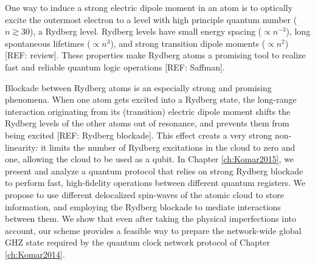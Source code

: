 One way to induce a strong electric dipole moment in an atom is to optically
excite the outermost electron to a level with high principle quantum number ($n
\gtrsim 30$), a Rydberg level. Rydberg levels have small energy spacing
($\propto n^{-3}$), long spontaneous lifetimes ($\propto n^3$), and strong
transition dipole moments ($\propto n^2$) [REF: review]. These properties make
Rydberg atoms a promising tool to realize fast and reliable quantum
logic operations [REF: Saffman]. 

Blockade between Rydberg atoms is an especially strong and promising phenomena.
When one atom gets excited into a Rydberg state, the long-range interaction
originating from its (transition) electric dipole moment shifts the Rydberg
levels of the other atoms out of resonance, and prevents them from being excited [REF: Rydberg
blockade]. This effect creats a very strong non-linearity: it limits the number
of Rydberg excitations in the cloud to zero and one, allowing the cloud to be
used as a qubit. In Chapter \ref{ch:Komar2015}, we present and analyze a quantum
protocol that relies on strong Rydberg blockade to perform fast, high-fidelity
operations between different quantum registers. We propose to use different
delocalized spin-waves of the atomic cloud to store information, and employing
the Rydberg blockade to mediate interactions between them. We show that even
after taking the physical imperfections into account, our scheme provides a
feasible way to prepare the network-wide global GHZ state required by the
quantum clock network protocol of Chapter \ref{ch:Komar2014}. 

 









